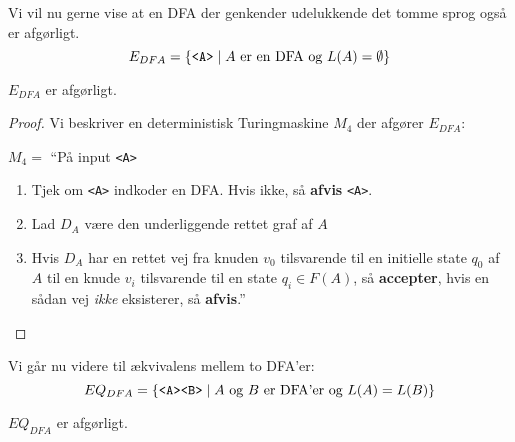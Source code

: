 Vi vil nu gerne vise at en DFA der genkender udelukkende det tomme sprog også er afgørligt.
\begin{equation*}
	E_{DFA} = \{\text{\texttt{<A>}} \mid A \text{ er en DFA og } L(A) = \emptyset\}
\end{equation*}

\begin{theorem}
	$E_{DFA}$ er afgørligt.
\end{theorem}

\begin{proof}
	Vi beskriver en deterministisk Turingmaskine $M_{4}$ der afgører $E_{DFA}$:

	$M_{4} = $ ``På input \texttt{<A>}
	\begin{enumerate}
		\item Tjek om \texttt{<A>} indkoder en DFA. Hvis ikke, så \textbf{afvis} \texttt{<A>}.
		\item Lad $D_{A}$ være den underliggende rettet graf af $A$
		\item Hvis $D_{A}$ har en rettet vej fra knuden $v_{0}$  tilsvarende til en initielle state $q_{0}$ af $A$ til en knude $v_{i}$ tilsvarende til en state $q_{i} \in F(A)$, så \textbf{accepter}, hvis en sådan vej \textit{ikke} eksisterer, så \textbf{afvis}.''
	\end{enumerate}
\end{proof}

Vi går nu videre til ækvivalens mellem to DFA'er:
\begin{equation*}
	EQ_{DFA} = \{\text{\texttt{<A><B>}} \mid A \text{ og } B \text{ er DFA'er og } L(A) = L(B)\}
\end{equation*}

\begin{theorem}
	$EQ_{DFA}$ er afgørligt.
\end{theorem}

